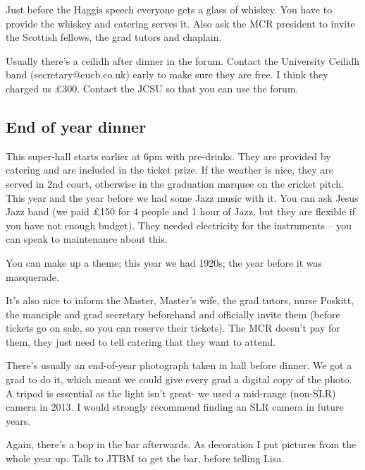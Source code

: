 \documentclass[9.5pt]{article} %
\begin{document}
Just before the Haggis speech everyone gets a glass of whiskey. You have to provide the whiskey and catering serves it. Also ask the MCR president to invite the Scottish fellows, the grad tutors and chaplain.
					
Usually there’s a ceilidh after dinner in the forum. Contact the University Ceilidh band (secretary@cucb.co.uk) early to make sure they are free. I think they charged us \pounds{300}. Contact the JCSU so that you can use the forum.

\subsection{End of year dinner} %

This super-hall starts earlier at 6pm with pre-drinks. They are provided by catering and are included in the ticket prize. If the weather is nice, they are served in 2nd court, otherwise in the graduation marquee on the cricket pitch. This year and the year before we had some Jazz music with it. You can ask Jesus Jazz band (we paid \pounds{150} for 4 people and 1 hour of Jazz, but they are flexible if you have not enough budget). They needed electricity for the instruments – you can speak to maintenance about this.
					
You can make up a theme; this year we had 1920s; the year before it was masquerade.
					
It’s also nice to inform the Master, Master’s wife, the grad tutors, nurse Poskitt, the manciple and grad secretary beforehand and officially invite them (before tickets go on sale, so you can reserve their tickets). The MCR doesn’t pay for them, they just need to tell catering that they want to attend.
					
There’s usually an end-of-year photograph taken in hall before dinner. We got a grad to do it, which meant we could give every grad a digital copy of the photo. A tripod is essential as the light isn't great- we used a mid-range (non-SLR) camera in 2013. I would strongly recommend finding an SLR camera in future years.
					
Again, there’s a bop in the bar afterwards. As decoration I put pictures from the whole year up. Talk to JTBM to get the bar, before telling Lisa.


\end{document}
